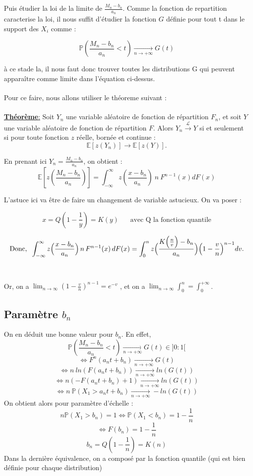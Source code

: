 \documentclass{article}
\begin{document}
Puis étudier la loi de la limite de $\frac{M_n - b_n}{a_n}$. Comme la fonction de repartition caracterise la loi, il nous suffit d'étudier la fonction $G$ définie pour tout t dans le support des $X_i$ comme :

\[
\mathbb{P} \left( \frac{M_n - b_n}{a_n} < t \right) \xrightarrow[n\to +\infty]{} G(t)
\]

à ce stade la, il nous faut donc trouver toutes les distributions G qui peuvent apparaître comme limite dans l’équation ci-dessus.
\\
\\
Pour ce faire, nous allons utiliser le théoreme suivant : 
\\
\\
\underline{\textbf{Théorème}:}
Soit \( Y_n \) une variable aléatoire de fonction de répartition \( F_n \), et soit \( Y \) une variable aléatoire de fonction de répartition \( F \).  
Alors $Y_n \xrightarrow{\mathcal{L} } Y$ si et seulement si pour toute fonction $z$ réelle, bornée et continue :
\[
\mathbb{E}[z(Y_n)] \to \mathbb{E}[z(Y)].
\]

En prenant ici $Y_n = \frac{M_n -b_n}{a_n}$, on obtient :
\[
\mathbb{E}[z(\frac{M_n -b_n}{a_n})] = \int_{-\infty}^{\infty} z(\frac{x-b_n}{a_n}) \: n \:  F^{n-1} (x)dF(x)
\]

L'astuce ici va être de faire un changement de variable astucieux. On va poser : 

\[
x = Q(1-\frac{1}{y}) = K(y) \; \; \; \; \; \; \text{avec Q la fonction quantile}
\]

\begin{equation}\label{eq:1.1}
    \text{Donc,} \; \; \int_{-\infty}^{\infty} z\Bigl(\frac{x-b_n}{a_n}\Bigr) \, n \, F^{n-1}(x)\,dF(x)
    =\int_{0}^{n} z\Bigl(\frac{K\Bigl(\frac{n}{v}\Bigr)-b_n}{a_n}\Bigr)
    \Bigl(1-\frac{v}{n}\Bigr)^{n-1}dv.
\end{equation}
\\
\\
Or, on a $\lim_{n \to \infty} ( 1 - \frac{v}{n})^{n-1} = e^{-v}$ , et on a $\lim_{n \to \infty} \int_{0}^{n} = \int_{0}^{+ \infty}$.

\subsection{Paramètre $b_n$}

On en déduit une bonne valeur pour $b_n$. En effet,
\[
\mathbb{P} \left( \frac{M_n - b_n}{a_n} < t \right) \xrightarrow[n\to +\infty]{} G(t) \in ]0:1[
\]
\[
\Longleftrightarrow F^n(a_n t + b_n) \xrightarrow[n\to +\infty]{} G(t)
\]
\[
\Longleftrightarrow n \: ln(F(a_n t + b_n)) \xrightarrow[n\to +\infty]{} ln(G(t))
\]
\[
\Longleftrightarrow n(- F(a_n t + b_n) + 1) \xrightarrow[n\to +\infty]{} ln(G(t))
\]
\[
\Longleftrightarrow n \: \mathbb{P}(X_1 > a_n t + b_n ) \xrightarrow[n\to +\infty]{} - ln(G(t))
\]
On obtient alors pour paramètre d'échelle :
\[
n \mathbb{P}(X_1 > b_n) =1  \Longleftrightarrow \mathbb{P}(X_1 < b_n) = 1 - \frac{1}{n}
\]
\[
\Longleftrightarrow F(b_n) = 1 - \frac{1}{n}
\]
\[
b_n = Q(1-\frac{1}{n}) = K(n)
\]
Dans la dernière équivalence, on a composé par la fonction quantile (qui est bien définie pour chaque distribution)
\\
\end{document}
